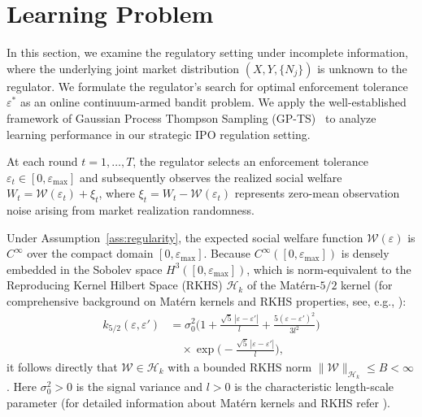 \section{Learning Problem}
\label{sec:learning}

In this section, we examine the regulatory setting under incomplete information, where the underlying joint market distribution $(X, Y, \{N_j\})$ is unknown to the regulator. We formulate the regulator's search for optimal enforcement tolerance $\varepsilon^*$ as an online continuum-armed bandit problem. We apply the well-established framework of Gaussian Process Thompson Sampling (GP-TS)~\cite{chowdhury2017kernelized} to analyze learning performance in our strategic IPO regulation setting.

At each round $t = 1, \dots, T$, the regulator selects an enforcement tolerance $\varepsilon_t \in [0, \varepsilon_{\max}]$ and subsequently observes the realized social welfare $W_t = \mathcal{W}(\varepsilon_t) + \xi_t$, where $\xi_t = W_t - \mathcal{W}(\varepsilon_t)$ represents zero-mean observation noise arising from market realization randomness.

Under Assumption~\ref{ass:regularity}, the expected social welfare function $\mathcal{W}(\varepsilon)$ is $C^{\infty}$ over the compact domain $[0, \varepsilon_{\max}]$. Because $C^{\infty}([0, \varepsilon_{\max}])$ is densely embedded in the Sobolev space $H^3([0, \varepsilon_{\max}])$, which is norm-equivalent to the Reproducing Kernel Hilbert Space (RKHS) $\mathcal{H}_k$ of the Mat\'ern-$5/2$ kernel (for comprehensive background on Mat\'ern kernels and RKHS properties, see, e.g., \cite{rasmussen2006gaussian, chowdhury2017kernelized}):
\begin{equation}
\label{eq:matern}
\begin{aligned}
k_{5/2}(\varepsilon, \varepsilon')
&= \sigma_0^2 \biggl( 1 + \frac{\sqrt{5}\,|\varepsilon-\varepsilon'|}{l} + \frac{5(\varepsilon-\varepsilon')^2}{3l^2} \biggr) \\
&\quad \times \exp\biggl( -\frac{\sqrt{5}\,|\varepsilon-\varepsilon'|}{l} \biggr),
\end{aligned}
\end{equation}
it follows directly that $\mathcal{W} \in \mathcal{H}_k$ with a bounded RKHS norm $\|\mathcal{W}\|_{\mathcal{H}_k} \le B < \infty$. Here $\sigma_0^2 > 0$ is the signal variance and $l > 0$ is the characteristic length-scale parameter (for detailed information about Matérn kernels and RKHS refer \cite{chowdhury2017kernelized}).

